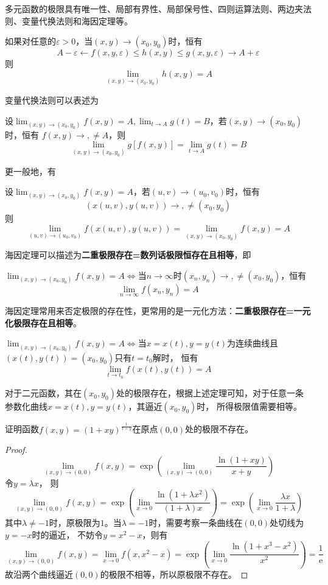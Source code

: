 多元函数的极限具有唯一性、局部有界性、局部保号性、四则运算法则、两边夹法则、变量代换法则和海因定理等。

\begin{theorem}
    如果对任意的$\varepsilon>0$，当$(x,y)\to(x_0,y_0)$时，恒有
    \[ A-\varepsilon \leftarrow f(x,y,\varepsilon) \leq h(x,y)\leq g(x,y,\varepsilon) \to A + \varepsilon \]
    则
    \[ \lim_{(x,y)\to(x_0,y_0)} h(x,y) = A \]
\end{theorem}

变量代换法则可以表述为
\begin{theorem}
    设$\lim_{(x,y)\to(x_0,y_0)} f(x,y) = A, \lim_{t\to A} g(t) = B$，若$(x,y)\to(x_0,y_0)$时，恒有
    $f(x,y)\to,\neq A$，则
    \[ \lim_{(x,y)\to(x_0,y_0)} g[f(x,y)] = \lim_{t\to A}g(t) = B \]
\end{theorem}
更一般地，有
\begin{theorem}
    设$\lim_{(x,y)\to(x_0,y_0)} f(x,y) = A$，若$(u,v)\to(u_0,v_0)$时，恒有
    \[ (x(u,v),y(u,v))\to,\neq(x_0,y_0) \]
    则
    \[ \lim_{(u,v)\to(u_0,v_0)}f(x(u,v),y(u,v)) = \lim_{(x,y)\to(x_0,y_0)} f(x,y) = A \]
\end{theorem}

海因定理可以描述为\textbf{\textsf{二重极限存在=数列话极限恒存在且相等}}，即
\begin{theorem}
    $\lim_{(x,y)\to(x_0,y_0)}f(x,y) = A \iff $当$n\to\infty$时$(x_n,y_n)\to,\neq(x_0,y_0)$，恒有
    \[ \lim_{n\to\infty} f(x_n,y_n) = A \]
\end{theorem}
\begin{situation}
    海因定理常用来否定极限的存在性，更常用的是一元化方法：\textbf{\textsf{二重极限存在=一元化极限存在且相等}}。
\end{situation}
\begin{theorem}
    $\lim_{(x,y)\to(x_0,y_0)}f(x,y) = A \iff $当$x=x(t),y=y(t)$为连续曲线且$(x(t),y(t))=(x_0,y_0)$只有$t=t_0$解时，
    恒有
    \[ \lim_{t\to t_0}f(x(t),y(t)) = A \]
\end{theorem}

对于二元函数，其在$(x_0,y_0)$处的极限存在，根据上述定理可知，对于任意一条参数化曲线$x=x(t),y=y(t)$，其逼近$(x_0,y_0)$时，
所得极限值需要相等。

\begin{example}
    证明函数$f(x,y)=(1+xy)^{\frac{1}{x+y}}$在原点$(0,0)$处的极限不存在。
\end{example}
\begin{proof}
    \[ \lim_{(x,y)\to(0,0)}f(x,y) = \exp\left(\lim_{(x,y)\to(0,0)}\frac{\ln(1+xy)}{x+y}\right) \]
    令$y=\lambda x$，
    则
    \[
        \lim_{(x,y)\to(0,0)}f(x,y)
        = \exp\left(\lim_{x\to 0}\frac{\ln(1+\lambda x^2)}{(1+\lambda)x}\right)
        = \exp\left(\lim_{x\to 0}\frac{\lambda x}{1+\lambda}\right)
    \]
    其中$\lambda \neq -1$时，原极限为$1$。当$\lambda = -1$时，需要考察一条曲线在$(0,0)$处切线为$y=-x$时的逼近，
    不妨令$y=x^2-x$，则有
    \[
        \lim_{(x,y)\to(0,0)}f(x,y)
        = \lim_{x\to 0} f(x,x^2-x)
        = \exp\left(\lim_{x\to 0}\frac{\ln(1+x^3-x^2)}{x^2}\right)
        = \frac{1}{\mathrm{e}}
    \]
    故沿两个曲线逼近$(0,0)$的极限不相等，所以原极限不存在。
\end{proof}

